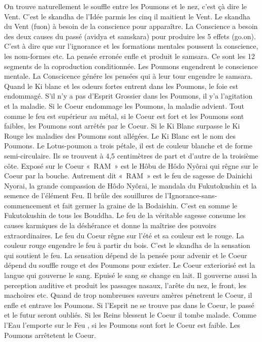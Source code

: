 On trouve naturellement le souffle entre les Poumons et le nez, c’est çà dire le Vent. C’est le skandha de l’Idée parmis les cinq il maitient le Vent. Le skandha du Vent (fuon) à besoin de la conscience pour apparaître. La Conscience a besoin des deux causes du passé (avidya et samskara) pour produire les 5 effets (go.on). C’est à dire que sur l’ignorance et les formations mentales poussent la conscience, les nom-formes etc. La pensée erronée enfle et produit le samsara. Ce sont les 12 segments de la coproduction conditionnée.
Les Poumons engendrent le conscience mentale. La Conscicence génére les pensées qui à leur tour engendre le samsara.
Quand le Ki blanc et les odeurs fortes entrent dans les Poumons, le foie est endommagé. S'il n’y a pas d’Esprit Grossier dans les Poumons, il y’a l’agitation et la maladie. Si le Coeur endommage les Poumons, la maladie advient.
Tout comme le feu est supérieur au métal, si le Coeur est fort et les Poumons sont faibles, les Poumons sont arrétés par le Coeur.
Si le Ki Blanc surpasse le Ki Rouge les maladies des Poumons sont allégées. Le Ki Blanc est le nom des Poumons.
 Le Lotus-poumon a trois pétale, il est de couleur blanche et de forme semi-circulaire. Ils se trouvent à 4,5 centimètres de part et d’autre de la troisième côte.
Exposé sur le Coeur
« RAM » est le Hôbu de Hôdo Nyôrai qui rêgne sur le Coeur par la bouche. Autrement dit « RAM » est le feu de sagesse de Dainichi Nyorai, la grande compassion de Hôdo Nyôrai, le mandala du Fukutokushin et la semence de l’élément Feu.
Il brûle des souillures de l’Ignorance-sans-commencement et fait germer la graine de la Bodaishin. C’est en somme le Fukutokushin de tous les Bouddha. Le feu de la véritable sagesse consume les causes karmiques de la déshérance et donne la maîtrise des pouvoirs extraordinaires.
Le feu du Coeur rêgne sur l’été et sa couleur est le rouge. La couleur rouge engendre le feu à partir du bois. C’est le skandha de la sensation qui soutient le feu. La sensation dépend de la pensée pour advenir et le Coeur dépend du souffle  rouge et des Poumons pour exister. Le Coeur exteriorisé est la langue qui gouverne le sang. Epuisé le sang se change en lait.  
Il gouverne aussi la perception auditive et produit les passages nasaux, l’arête du nez, le front, les machoires etc. Quand de trop nombreuses saveurs amères pénetrent le Coeur, il enfle et entrave les Poumons. Si l’Esprit ne se trouve pas dans le Coeur, le passé et le futur seront oubliés.
Si les Reins blessent le Coeur il tombe malade. Comme l’Eau l’emporte sur le Feu , si les Poumons sont fort le Coeur est faible. Les Poumons arrêtetent le Coeur.
